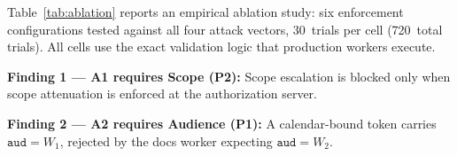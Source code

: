 \documentclass[journal]{IEEEtran}
\begin{document}
Table~\ref{tab:ablation} reports an empirical ablation study: six enforcement
configurations tested against all four attack vectors, 30~trials per cell
(720~total trials). All cells use the exact validation logic that production
workers execute.

\begin{table}[h]
\caption{Ablation study: property independence ($N=30$; 720 total trials)}
\label{tab:ablation}
\centering
\footnotesize
\setlength{\tabcolsep}{3pt}
\end{table}

\textbf{Finding 1 — A1 requires Scope (P2):} Scope escalation is blocked only
when scope attenuation is enforced at the authorization server.

\textbf{Finding 2 — A2 requires Audience (P1):} A calendar-bound token carries
$\texttt{aud}=W_1$, rejected by the docs worker expecting $\texttt{aud}=W_2$.
\end{document}

